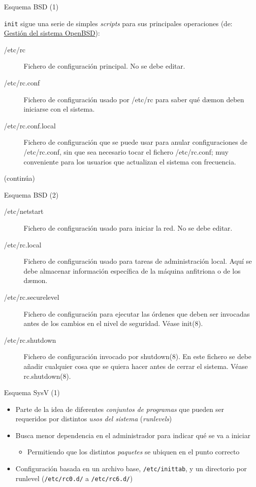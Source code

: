 \documentclass[presentation]{beamer}
\begin{document}
\begin{frame}[label={sec:org0aed699},fragile]{Esquema BSD (1)}
 \begin{center}
\texttt{init} sigue una serie de simples \emph{scripts} para sus principales
operaciones (de: \href{http://openbsd.org/faq/es/faq10.html}{Gestión del sistema OpenBSD}):
\end{center}
\begin{description}
\item[{/etc/rc}] Fichero de configuración principal. No se debe editar.
\item[{/etc/rc.conf}] Fichero de configuración usado por /etc/rc para
saber qué dæmon deben iniciarse con el sistema.
\item[{/etc/rc.conf.local}] Fichero de configuración que se puede usar
para anular configuraciones de /etc/rc.conf, sin que sea
necesario tocar el fichero /etc/rc.conf; muy conveniente para
los usuarios que actualizan el sistema con frecuencia.
\end{description}
(continúa)
\end{frame}

\begin{frame}[label={sec:org737c7a8}]{Esquema BSD (2)}
\begin{description}
\item[{/etc/netstart}] Fichero de configuración usado para iniciar la red. No se debe editar.
\item[{/etc/rc.local}] Fichero de configuración usado para tareas de
administración local. Aquí se debe almacenar
información específica de la máquina anfitriona o
de los dæmon.
\item[{/etc/rc.securelevel}] Fichero de configuración para ejecutar las
órdenes que deben ser invocadas antes de los cambios en el
nivel de seguridad. Véase init(8).
\item[{/etc/rc.shutdown}] Fichero de configuración invocado por
shutdown(8). En este fichero se debe añadir cualquier cosa que
se quiera hacer antes de cerrar el sistema. Véase
rc.shutdown(8).
\end{description}
\end{frame}

\begin{frame}[label={sec:orgd9bfedc},fragile]{Esquema SysV (1)}
 \begin{itemize}
\item Parte de la idea de diferentes \emph{conjuntos de programas} que pueden
ser requeridos por distintos \emph{usos del sistema} (\emph{runlevels})
\item Busca menor dependencia en el administrador para indicar qué se va
a iniciar
\begin{itemize}
\item Permitiendo que los distintos \emph{paquetes} se ubiquen en el punto correcto
\end{itemize}
\item Configuración basada en un archivo base, \texttt{/etc/inittab}, y un
directorio por runlevel (\texttt{/etc/rc0.d/} a \texttt{/etc/rc6.d/})
\end{itemize}
\end{frame}
\end{document}
